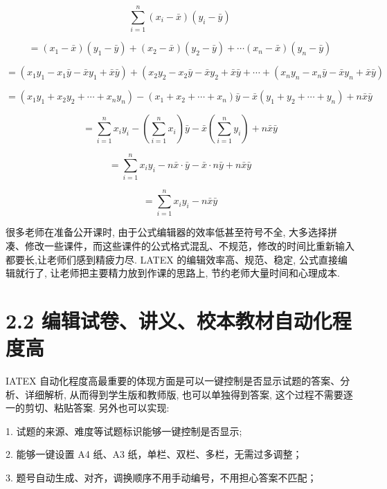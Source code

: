 \documentclass[10pt]{article}
\begin{document}
\[
\mathop{\sum }\limits_{{i = 1}}^{n}\left( {{x}_{i} - \bar{x}}\right) \left( {{y}_{i} - \bar{y}}\right)
\]

\[
= \left( {{x}_{1} - \bar{x}}\right) \left( {{y}_{1} - \bar{y}}\right)  + \left( {{x}_{2} - \bar{x}}\right) \left( {{y}_{2} - \bar{y}}\right)  + \cdots \left( {{x}_{n} - \bar{x}}\right) \left( {{y}_{n} - \bar{y}}\right)
\]

\[
= \left( {{x}_{1}{y}_{1} - {x}_{1}\bar{y} - \bar{x}{y}_{1} + \bar{x}\bar{y}}\right)  + \left( {{x}_{2}{y}_{2} - {x}_{2}\bar{y} - \bar{x}{y}_{2} + \bar{x}\bar{y} + \cdots  + \left( {{x}_{n}{y}_{n} - {x}_{n}\bar{y} - \bar{x}{y}_{n} + \bar{x}\bar{y}}\right) }\right.
\]

\[
= \left( {{x}_{1}{y}_{1} + {x}_{2}{y}_{2} + \cdots  + {x}_{n}{y}_{n}}\right)  - \left( {{x}_{1} + {x}_{2} + \cdots  + {x}_{n}}\right) \bar{y} - \bar{x}\left( {{y}_{1} + {y}_{2} + \cdots  + {y}_{n}}\right)  + n\bar{x}\bar{y}
\]

\[
= \mathop{\sum }\limits_{{i = 1}}^{n}{x}_{i}{y}_{i} - \left( {\mathop{\sum }\limits_{{i = 1}}^{n}{x}_{i}}\right) \bar{y} - \bar{x}\left( {\mathop{\sum }\limits_{{i = 1}}^{n}{y}_{i}}\right)  + n\bar{x}\bar{y}
\]

\[
= \mathop{\sum }\limits_{{i = 1}}^{n}{x}_{i}{y}_{i} - n\bar{x} \cdot  \bar{y} - \bar{x} \cdot  n\bar{y} + n\bar{x}\bar{y}
\]

\[
= \mathop{\sum }\limits_{{i = 1}}^{n}{x}_{i}{y}_{i} - n\bar{x}\bar{y}
\]

很多老师在准备公开课时, 由于公式编辑器的效率低甚至符号不全, 大多选择拼凑、修改一些课件，而这些课件的公式格式混乱、不规范，修改的时间比重新输入都要长,让老师们感到精疲力尽. LATEX 的编辑效率高、规范、稳定, 公式直接编辑就行了, 让老师把主要精力放到作课的思路上, 节约老师大量时间和心理成本.

\section*{2.2 编辑试卷、讲义、校本教材自动化程度高}

IATEX 自动化程度高最重要的体现方面是可以一键控制是否显示试题的答案、分析、详细解析, 从而得到学生版和教师版, 也可以单独得到答案, 这个过程不需要逐一的剪切、粘贴答案. 另外也可以实现:

1. 试题的来源、难度等试题标识能够一键控制是否显示;

2. 能够一键设置 A4 纸、A3 纸，单栏、双栏、多栏，无需过多调整；

3. 题号自动生成、对齐，调换顺序不用手动编号，不用担心答案不匹配；
\end{document}
